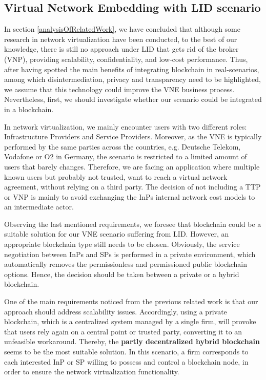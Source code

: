 \subsection{Virtual Network Embedding with LID scenario}

In section \ref{analysisOfRelatedWork}, we have concluded that although some research in network virtualization have been conducted, to the best of our knowledge, there is still no approach under LID that gets rid of the broker (VNP), providing scalability, confidentiality, and low-cost performance. Thus, after having spotted the main benefits of integrating blockchain in real-scenarios, among which disintermediation, privacy  and transparency need to be highlighted, we assume that this technology could improve the VNE business process. Nevertheless, first, we should investigate whether our scenario could be integrated in a blockchain.

In network virtualization, we mainly encounter users with two different roles: Infrastructure Providers and Service Providers. Moreover, as the VNE is typically performed by the same parties across the countries, e.g. Deutsche Telekom, Vodafone or O2 in Germany, the scenario is restricted to a limited amount of users that barely changes. Therefore, we are facing an application where multiple known users but probably not trusted, want to reach a virtual network agreement, without relying on a third party. The decision of not including a TTP or VNP is mainly to avoid exchanging the InPs internal network cost models to an intermediate actor.

Observing the last mentioned requirements, we foresee that blockchain could be a suitable solution for our VNE scenario suffering from LID. However, an appropriate blockchain type still needs to be chosen. Obviously, the service negotiation between InPs and SPs is performed in a private environment, which automatically removes the permissionless and permissioned public blockchain options. Hence, the decision should be taken between a private or a hybrid blockchain.

One of the main requirements noticed from the previous related work is that our approach should address scalability issues. Accordingly, using a private blockchain, which is a centralized system managed by a single firm, will provoke that users rely again on a central point or trusted party, converting it to an unfeasible workaround. Thereby, the \textbf{partly decentralized hybrid blockchain} seems to be the most suitable solution. In this scenario, a firm corresponds to each interested InP or SP willing to possess and control a blockchain node, in order to ensure the network virtualization functionality.


